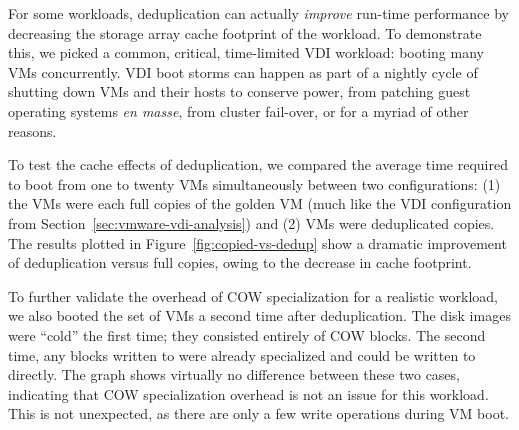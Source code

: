 
For some workloads, deduplication can actually \emph{improve} run-time
performance by decreasing the storage array cache footprint of the
workload.  To demonstrate this, we picked a common, critical,
time-limited VDI workload: booting many VMs concurrently.  VDI boot
storms can happen as part of a nightly cycle of shutting down VMs and
their hosts to conserve power, from patching guest
operating systems \emph{en masse}, from cluster fail-over, or for a
myriad of other reasons.

To test the cache effects of deduplication, we compared the average time
required to boot from one to twenty VMs simultaneously between two
configurations:
(1) the VMs were each full copies of the golden VM
(much like the VDI configuration from
Section~\ref{sec:vmware-vdi-analysis}) and (2) VMs
were deduplicated copies.  The results plotted in
Figure~\ref{fig:copied-vs-dedup} show a dramatic improvement of
deduplication versus full copies, owing to the decrease in
cache footprint.

To further validate the overhead of COW specialization for a realistic
workload, we also booted the set of VMs a second time after
deduplication.  The disk images were ``cold'' the first time; they
consisted entirely of COW blocks.  The second time, any blocks
written to were already specialized and could be written to directly.
The graph shows virtually no difference between these two cases,
indicating that COW specialization overhead is not an issue for this
workload.  This is not unexpected, as there are only a few write
operations during VM boot.




